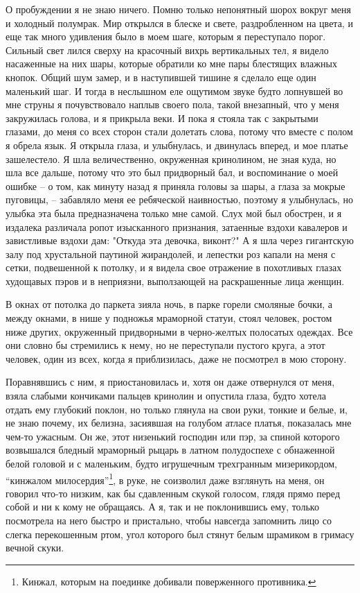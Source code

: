 О пробуждении я не знаю ничего. Помню только  непонятный  шорох  вокруг
меня  и  холодный  полумрак. Мир открылся в блеске и свете, раздробленном на
цвета, и еще так много удивления было в моем  шаге,  которым  я  переступало
порог.  Сильный  свет  лился  сверху  на красочный вихрь вертикальных тел, я
видело насаженные на них  шары,  которые  обратили  ко  мне  пары  блестящих
влажных  кнопок.  Общий шум замер, и в наступившей тишине я сделало еще один
маленький шаг. И тогда в неслышном еле ощутимом звуке будто лопнувшей во мне
струны я почувствовало наплыв своего  пола,  такой  внезапный,  что  у  меня
закружилась  голова,  и  я  прикрыла  веки.  И пока я стояла так с закрытыми
глазами, до меня со всех сторон стали долетать слова, потому  что  вместе  с
полом  я  обрела  язык. Я открыла глаза, и улыбнулась, и двинулась вперед, и
мое платье зашелестело. Я шла величественно, окруженная кринолином, не  зная
куда, но шла все дальше, потому что это был придворный бал, и воспоминание о
моей  ошибке -- о том, как минуту назад я приняла головы за шары, а глаза за
мокрые пуговицы, -- забавляло  меня  ее  ребяческой  наивностью,  поэтому  я
улыбнулась,  но улыбка эта была предназначена только мне самой. Слух мой был
обострен, и я издалека  различала  ропот  изысканного  признания,  затаенные
вздохи кавалеров и завистливые вздохи дам: "Откуда эта девочка, виконт?" А я
шла  через  гигантскую  залу под хрустальной паутиной жирандолей, и лепестки
роз капали на меня с сетки, подвешенной к потолку, и я видела свое отражение
в  похотливых  глазах  худощавых  пэров  и  в  неприязни,   выползающей   на
раскрашенные лица женщин.

В окнах от потолка  до паркета зияла ночь, в парке  горели смоляные бочки, а
между окнами, в нише у подножья мраморной статуи, стоял человек, ростом ниже
других,  окруженный придворными  в черно-желтых  полосатых одеждах.  Все они
словно  бы стремились  к  нему,  но не  переступали  пустого  круга, а  этот
человек,  один из  всех,  когда  я приблизилась,  даже  не  посмотрел в  мою
сторону.

Поравнявшись с  ним, я приостановилась и,  хотя он даже отвернулся  от меня,
взяла  слабыми кончиками  пальцев кринолин  и опустила  глаза, будто  хотела
отдать ему глубокий поклон, но только  глянула на свои руки, тонкие и белые,
и,  не  знаю  почему,  их  белизна,  засиявшая  на  голубом  атласе  платья,
показалась мне  чем-то ужасным. Он же,  этот низенький господин или  пэр, за
спиной которого возвышался  бледный мраморный рыцарь в  латном полудоспехе с
обнаженной  белой  головой  и  с  маленьким,  будто  игрушечным  трехгранным
мизерикордом, ``кинжалом  милосердия''\footnote{Кинжал, которым  на поединке
добивали поверженного противника.},  в руке, не соизволил  даже взглянуть на
меня,  он говорил  что-то низким,  как бы  сдавленным скукой  голосом, глядя
прямо перед собой и ни к кому не  обращаясь. А я, так и не поклонившись ему,
только посмотрела на него быстро и пристально, чтобы навсегда запомнить лицо
со  слегка перекошенным  ртом, угол  которого  был стянут  белым шрамиком  в
гримасу вечной скуки.

